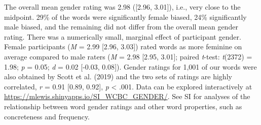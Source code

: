 \documentclass[
  english,
  ,man,floatsintext]{apa6}
\begin{document}
The overall mean gender rating was 2.98 ({[}2.96, 3.01{]}), i.e., very close to the midpoint. 29\% of the words were significantly female biased, 24\% significantly male biased, and the remaining did not differ from the overall mean gender rating. There was a numerically small, marginal effect of participant gender. Female participants (\emph{M} = 2.99 {[}2.96, 3.03{]}) rated words as more feminine on average compared to male raters (\emph{M} = 2.98 {[}2.95, 3.01{]}; paired \emph{t}-test: \emph{t}(2372) = 1.98; \emph{p} = 0.05; \emph{d} = 0.02 {[}-0.03, 0.08{]}). Gender ratings for 1,001 of our words were also obtained by Scott et al. (2019) and the two sets of ratings are highly correlated, \emph{r} = 0.91 {[}0.89, 0.92{]}, \emph{p} \textless{} .001. Data can be explored interactively at \url{https://mlewis.shinyapps.io/SI_WCBC_GENDER/}. See SI for analyses of the relationship between word gender ratings and other word properties, such as concreteness and frequency.
\end{document}
